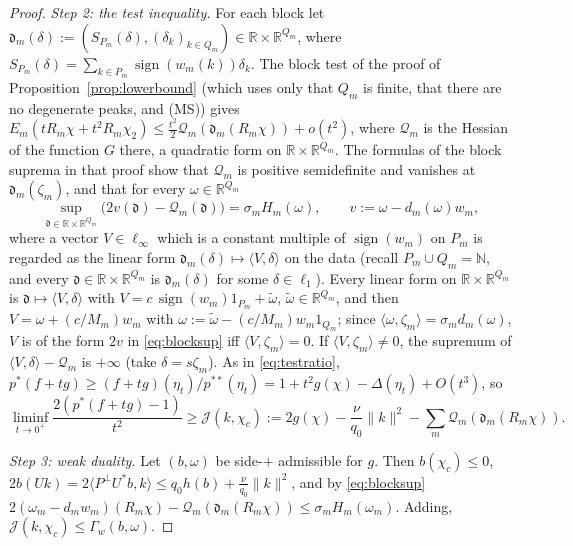 \documentclass[10pt]{amsart}
\theoremstyle{definition}
\theoremstyle{remark}
\newcommand{\sgn}{\operatorname{sign}}
\newcommand{\R}{\mathbb R}
\newcommand{\N}{\mathbb N}
\newcommand{\ip}[2]{\langle #1,#2\rangle}
\begin{document}
\begin{proof}
\emph{Step 2: the test inequality.}  For each block let
$\mathfrak d_m(\delta):=(S_{P_m}(\delta),(\delta_k)_{k\in Q_m})\in
\R\times\R^{Q_m}$, where $S_{P_m}(\delta)=\sum_{k\in P_m}\sgn(w_m(k))\delta_k$.
The block test of the proof of Proposition~\ref{prop:lowerbound} (which uses
only that $Q_m$ is finite, that there are no degenerate peaks, and
\textup{(MS)}) gives $E_m(tR_m\chi+t^2R_m\chi_2)\le\frac{t^2}2\mathcal
Q_m(\mathfrak d_m(R_m\chi))+o(t^2)$, where $\mathcal Q_m$ is the Hessian
of the function $G$ there, a quadratic form on $\R\times\R^{Q_m}$.  The
formulas of the block suprema in that proof show that $\mathcal Q_m$ is
positive semidefinite and vanishes at $\mathfrak d_m(\zeta_m)$, and that
for every $\omega\in\R^{Q_m}$
\begin{equation}\label{eq:blocksup}
 \sup_{\mathfrak d\in\R\times\R^{Q_m}}\big(2v(\mathfrak d)-\mathcal Q_m(
 \mathfrak d)\big)=\sigma_mH_m(\omega),\qquad v:=\omega-d_m(\omega)w_m,
\end{equation}
where a vector $V\in\ell_\infty$ which is a constant multiple of
$\sgn(w_m)$ on $P_m$ is regarded as the linear form
$\mathfrak d_m(\delta)\mapsto\ip V\delta$ on the data (recall
$P_m\cup Q_m=\N$, and every $\mathfrak d\in\R\times\R^{Q_m}$ is
$\mathfrak d_m(\delta)$ for some $\delta\in\ell_1$).  Every linear form
on $\R\times\R^{Q_m}$ is $\mathfrak d\mapsto\ip V\delta$ with
$V=c\,\sgn(w_m)1_{P_m}+\tilde\omega$, $\tilde\omega\in\R^{Q_m}$, and then
$V=\omega+(c/M_m)w_m$ with $\omega:=\tilde\omega-(c/M_m)w_m1_{Q_m}$; since
$\ip{\omega}{\zeta_m}=\sigma_md_m(\omega)$, $V$ is of the form $2v$ in
\eqref{eq:blocksup} iff $\ip V{\zeta_m}=0$.  If $\ip V{\zeta_m}\ne0$, the
supremum of $\ip V\delta-\mathcal Q_m$ is $+\infty$ (take
$\delta=s\zeta_m$).  As in \eqref{eq:testratio}, $p^*(f+tg)\ge
(f+tg)(\eta_t)/p^{**}(\eta_t)=1+t^2g(\chi)-\Delta(\eta_t)+O(t^3)$, so
\[
 \liminf_{t\to0^+}\frac{2(p^*(f+tg)-1)}{t^2}\ge\mathcal J(k,\chi_c):=2g(\chi)
 -\frac\nu{q_0}\|k\|^2-\sum_m\mathcal Q_m(\mathfrak d_m(R_m\chi)).
\]

\emph{Step 3: weak duality.}  Let $(b,\omega)$ be side-$+$ admissible for
$g$.  Then $b(\chi_c)\le0$, $2b(Uk)=2\ip{P^\perp U^*b}{k}\le q_0h(b)+
\frac\nu{q_0}\|k\|^2$, and by \eqref{eq:blocksup}
$2(\omega_m-d_mw_m)(R_m\chi)-\mathcal Q_m(\mathfrak d_m(R_m\chi))\le
\sigma_mH_m(\omega_m)$.  Adding, $\mathcal J(k,\chi_c)\le\Gamma_w(b,\omega)$.


\end{proof}
\end{document}
